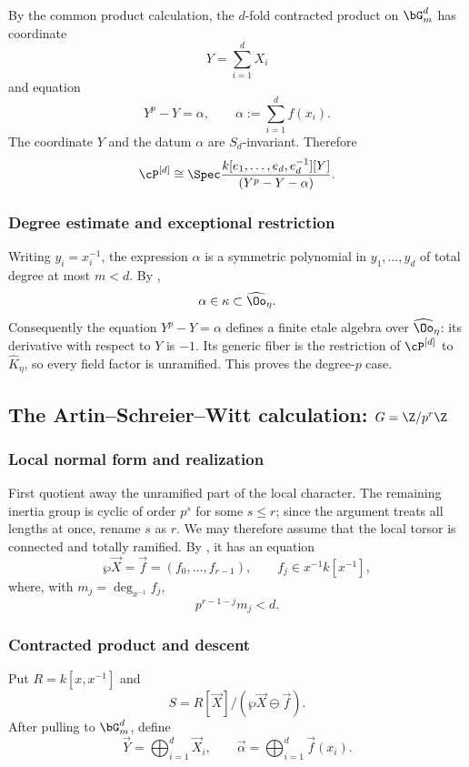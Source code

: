 By the common product calculation, the $d$-fold contracted product on
$\bG_m^d$ has coordinate
\[
    Y=\sum_{i=1}^dX_i
\]
and equation
\[
    Y^p-Y=\alpha,
    \qquad \alpha:=\sum_{i=1}^df(x_i).
\]
The coordinate $Y$ and the datum $\alpha$ are $S_d$-invariant. Therefore
\[
  \cP^{[d]}\cong
  \Spec\frac{k[e_1,\dots,e_d,e_d^{-1}][Y]}{(Y^p-Y-\alpha)}.
\]

\subsubsection*{Degree estimate and exceptional restriction}

Writing $y_i=x_i^{-1}$, the expression $\alpha$ is a symmetric polynomial in
$y_1,\dots,y_d$ of total degree at most $m<d$. By
,
\[
    \alpha\in\kappa\subset\widehat\Oo_\eta.
\]
Consequently the equation $Y^p-Y=\alpha$ defines a finite etale algebra over
$\widehat\Oo_\eta$: its derivative with respect to $Y$ is $-1$. Its generic
fiber is the restriction of $\cP^{[d]}$ to $\widehat K_\eta$, so every field
factor is unramified. This proves the degree-$p$ case.

\subsection{\texorpdfstring{The Artin--Schreier--Witt calculation: $G=\Z/p^r\Z$}{The Artin--Schreier--Witt calculation}}

\subsubsection*{Local normal form and realization}

First quotient away the unramified part of the local character. The remaining
inertia group is cyclic of order $p^s$ for some $s\leq r$; since the argument
treats all lengths at once, rename $s$ as $r$. We may therefore assume that the
local torsor is connected and totally ramified. By
, it has an equation
\[
     \wp\vec X=\vec f=(f_0,\dots,f_{r-1}),
     \qquad f_j\in x^{-1}k[x^{-1}],
\]
where, with $m_j=\deg_{x^{-1}}f_j$,
\[
     p^{r-1-j}m_j<d.
\]

\subsubsection*{Contracted product and descent}

Put $R=k[x,x^{-1}]$ and
\[
 S=R[\vec X]/(\wp\vec X\ominus\vec f).
\]
After pulling to $\bG_m^d$, define
\[
   \vec Y=\bigoplus_{i=1}^d\vec X_i,
   \qquad
   \vec\alpha=\bigoplus_{i=1}^d\vec f(x_i).
\]

